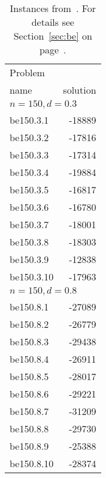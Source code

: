 \documentclass[a4paper, 12pt]{article}
\begin{document}
\begin{table}
\begin{center}
\begin{minipage}{30ex}
\begin{tabular}{|l|r|}
\hline
Problem & \\
name & solution\\
\hline
\multicolumn{2}{|l|}{$n=150, d=0.3$}\\
\hline
be150.3.1  & -18889 \\
be150.3.2  & -17816 \\
be150.3.3  & -17314 \\
be150.3.4  & -19884 \\
be150.3.5  & -16817 \\
be150.3.6  & -16780 \\
be150.3.7  & -18001 \\
be150.3.8  & -18303 \\
be150.3.9  & -12838 \\
be150.3.10 & -17963 \\
\hline
\multicolumn{2}{|l|}{$n=150, d=0.8$}\\
\hline
be150.8.1  & -27089 \\
be150.8.2  & -26779 \\
be150.8.3  & -29438 \\
be150.8.4  & -26911 \\
be150.8.5  & -28017 \\
be150.8.6  & -29221 \\
be150.8.7  & -31209 \\
be150.8.8  & -29730 \\
be150.8.9  & -25388 \\
be150.8.10 & -28374 \\
\hline
\end{tabular}
\end{minipage}
\caption{Instances from~\cite{BiEl:07}. For details
  see Section~\ref{sec:be} on page~\pageref{sec:be}.} \label{tab:be1} 
\end{center}
\end{table}
\end{document}
